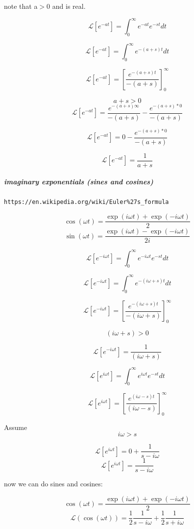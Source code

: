 \documentclass[17pt]{extarticle}
\begin{document}
note that a$>$0 and is real.

$$\mathcal{L} \left[ e^{-at} \right] = \int_0^\infty e^{-at} e^{-st} dt$$

$$\mathcal{L} \left[ e^{-at} \right] = \int_0^\infty  e^{-(a+s)t} dt$$

$$\mathcal{L} \left[ e^{-at} \right] = \left[ \frac{e^{-(a+s)t}}{-(a+s)}\right]_0^\infty$$

$$a+s > 0$$
$$\mathcal{L} \left[ e^{-at} \right] = \frac{e^{-(a+s)\infty}}{-(a+s)} - \frac{e^{-(a+s)*0}}{-(a+s)}$$

$$\mathcal{L} \left[ e^{-at} \right] = 0 - \frac{e^{-(a+s)*0}}{-(a+s)}$$

$$\mathcal{L} \left[ e^{-at} \right] =  \frac{1}{a+s}$$

\subparagraph{imaginary exponentials (sines and cosines)}

\begin{verbatim}
https://en.wikipedia.org/wiki/Euler%27s_formula
\end{verbatim}

$$\cos (\omega t) = \frac{\exp (i \omega t) + \exp (- i \omega t)}{2}$$
$$\sin (\omega t) = \frac{\exp (i \omega t) - \exp (- i \omega t)}{2i}$$

$$\mathcal{L} \left[ e^{-i\omega t} \right] = \int_0^\infty e^{-i\omega t} e^{-st} dt$$

$$\mathcal{L} \left[ e^{-i\omega t} \right] = \int_0^\infty e^{-(i\omega+s) t} dt$$

$$\mathcal{L} \left[ e^{-i\omega t} \right] = \left[ \frac{e^{-(i \omega+s)t}}{-(i \omega+s)}\right]_0^\infty$$

$$(i\omega +s) > 0$$

$$\mathcal{L} \left[ e^{-i\omega t} \right] = \frac{1}{(i \omega+s)}$$

$$\mathcal{L} \left[ e^{i\omega t} \right] = \int_0^\infty e^{i\omega t} e^{-st} dt$$

$$\mathcal{L} \left[ e^{i\omega t} \right] = \left[ \frac{e^{(i\omega-s)t}}{(i\omega-s)}\right]_0^\infty$$

Assume
$$i \omega  > s$$

$$\mathcal{L} \left[ e^{i\omega t} \right] = 0 + \frac{1}{s- i \omega }$$
$$\mathcal{L} \left[ e^{i\omega t} \right] = \frac{1}{s- i \omega }$$

now we can do sines and cosines:


$$\cos (\omega t) = \frac{\exp (i \omega t) + \exp (- i \omega t)}{2}$$
$$\mathcal{L}(\cos (\omega t)) =\frac{1}{2} \frac{1}{s- i \omega } + \frac{1}{2} \frac{1}{s+i \omega}$$
\end{document}
